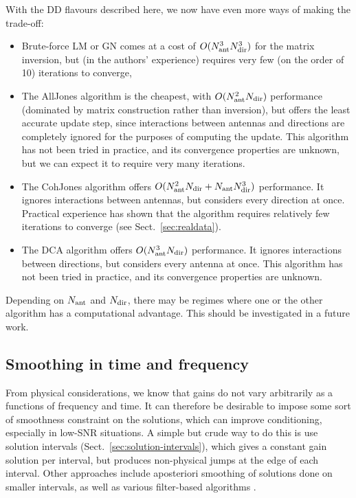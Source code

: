 \documentclass[useAMS,usenatbib]{mn2e}
\begin{document}
With the DD flavours described here, we now have even more ways of making the trade-off:

\begin{itemize}
\item Brute-force LM or GN comes at a cost of $O(N_\mathrm{ant}^3N_\mathrm{dir}^3)$ for the matrix inversion, but (in the authors' experience) requires
very few (on the order of 10) iterations to converge,
\item The {\sc AllJones} algorithm is the cheapest, with $O(N_\mathrm{ant}^2N_\mathrm{dir})$ performance (dominated by matrix construction rather than inversion), but offers the least accurate update step, since interactions between antennas and directions 
are completely ignored for the purposes of computing the update. This algorithm has not been tried in practice, and its convergence properties are unknown, but we can expect it to require very many iterations.
\item The {\sc CohJones} algorithm offers $O(N_\mathrm{ant}^2N_\mathrm{dir}+N_\mathrm{ant}N_\mathrm{dir}^3)$ performance. It ignores interactions between antennas,
but considers every direction at once. Practical experience has shown that the algorithm
requires relatively few iterations to converge (see Sect.~\ref{sec:realdata}).
\item The {\sc DCA} algorithm offers $O(N_\mathrm{ant}^3N_\mathrm{dir})$ performance. It ignores interactions between directions,
but considers every antenna at once. This algorithm has not been tried in practice, and its convergence properties are unknown.
\end{itemize}

Depending on $N_\mathrm{ant}$ and $N_\mathrm{dir}$, there may be regimes where one or the other algorithm has a computational advantage. This should be investigated in a future work.

\subsection{Smoothing in time and frequency}
\label{sec:DI:smooth}

From physical considerations, we know that gains do not vary arbitrarily as a functions of frequency and time. It can
therefore be desirable to impose some sort of smoothness constraint on the solutions, which can improve conditioning, especially
in low-SNR situations. A simple but crude way to do this is use solution intervals (Sect.~\ref{sec:solution-intervals}),
which gives a constant gain solution per interval, but produces non-physical jumps at the edge of each interval.
Other approaches include aposteriori smoothing of solutions done on smaller intervals, as well as various filter-based 
algorithms \citep{tasse-filters}. 
\end{document}
